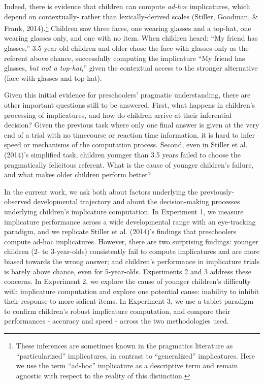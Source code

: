 \documentclass[a4paper,man,apacite,floatsintext]{apa6}
\begin{document}
Indeed, there is evidence that children can compute \emph{ad-hoc}
implicatures, which depend on contextually- rather than
lexically-derived scales (Stiller, Goodman, \& Frank, 2014).\footnote{These
  inferences are sometimes known in the pragmatics literature as
  ``particularized'' implicatures, in contrast to ``generalized''
  implicatures. Here we use the term ``ad-hoc'' implicature as a
  descriptive term and remain agnostic with respect to the reality of
  this distinction.} Children saw three faces, one wearing glasses and a
top-hat, one wearing glasses only, and one with no item. When children
heard: ``My friend has glasses,'' 3.5-year-old children and older chose
the face with glasses only as the referent above chance, successfully
computing the implicature ``My friend has glasses, \emph{but not a
top-hat},'' given the contextual access to the stronger alternative
(face with glasses and top-hat).

Given this initial evidence for preschoolers' pragmatic understanding,
there are other important questions still to be answered. First, what
happens in children's processing of implicatures, and how do children
arrive at their inferential decision? Given the previous task where only
one final answer is given at the very end of a trial with no timecourse
or reaction time information, it is hard to infer speed or mechanisms of
the computation process. Second, even in Stiller et al. (2014)'s
simplified task, children younger than 3.5 years failed to choose the
pragmatically felicitous referent. What is the cause of younger
children's failure, and what makes older children perform better?

In the current work, we ask both about factors underlying the
previously-observed developmental trajectory and about the
decision-making processes underlying children's implicature computation.
In Experiment 1, we measure implicature performance across a wide
developmental range with an eye-tracking paradigm, and we replicate
Stiller et al. (2014)'s findings that preschoolers compute ad-hoc
implicatures. However, there are two surprising findings: younger
children (2- to 3-year-olds) consistently fail to compute implicatures
and are more biased towards the wrong answer; and children's performance
in implicature trials is barely above chance, even for 5-year-olds.
Experiments 2 and 3 address these concerns. In Experiment 2, we explore
the cause of younger children's difficulty with implicature computation
and explore one potential cause: inability to inhibit their response to
more salient items. In Experiment 3, we use a tablet paradigm to confirm
children's robust implicature computation, and compare their
performances - accuracy and speed - across the two methodologies used.
\end{document}
